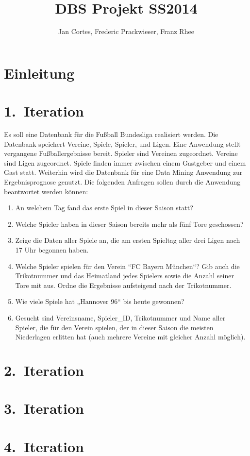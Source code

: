 \documentclass[
10pt,
a4paper
]{scrartcl}
\title{DBS Projekt SS2014}
\author{Jan Cortes, Frederic Prackwieser, Franz Rhee}
\date{}
\begin{document}
\maketitle
\tableofcontents

\section*{Einleitung}

\section{1.~Iteration}
Es soll eine Datenbank f\"{u}r die Fußball Bundesliga realisiert werden. Die Datenbank speichert Vereine, Spiele, Spieler, und Ligen. Eine Anwendung stellt vergangene Fußballergebnisse bereit. Spieler sind Vereinen zugeordnet. Vereine sind Ligen zugeordnet. Spiele finden immer zwischen einem Gastgeber und einem Gast statt.
Weiterhin wird die Datenbank für eine Data Mining Anwendung zur Ergebnisprognose genutzt.
Die folgenden Anfragen sollen durch die Anwendung beantwortet werden k\"{o}nnen:

\begin{enumerate}

\item An welchem Tag fand das erste Spiel in dieser Saison statt?
\item Welche Spieler haben in dieser Saison bereits mehr als fünf Tore geschossen?
\item Zeige die Daten aller Spiele an, die am ersten Spieltag aller drei Ligen nach 17 Uhr begonnen haben.
\item Welche Spieler spielen für den Verein “FC Bayern München“? Gib auch die Trikotnummer und das Heimatland jedes Spielers sowie die Anzahl seiner Tore mit aus. Ordne die Ergebnisse aufsteigend nach der Trikotnummer.
\item Wie viele Spiele hat „Hannover 96“ bis heute gewonnen?
\item Gesucht sind Vereinsname, Spieler{\_}ID, Trikotnummer und Name aller Spieler, die für den Verein spielen, der in dieser Saison die meisten Niederlagen erlitten hat (auch mehrere Vereine mit gleicher Anzahl möglich).

\end{enumerate}



\section{2.~Iteration}

\section{3.~Iteration}

\section{4.~Iteration}
\end{document}
